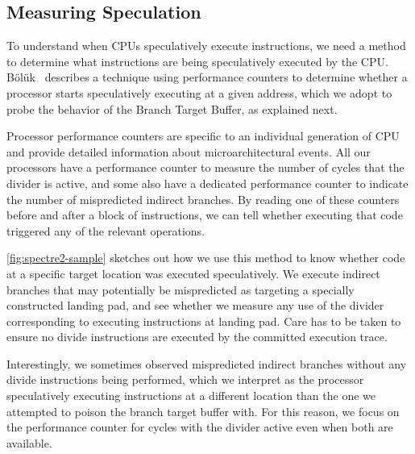 \subsection{Measuring Speculation}

To understand when CPUs speculatively execute instructions, we need a
method to determine what instructions are being speculatively executed
by the CPU.  Bölük~\cite{speculating-x86} describes a technique using
performance counters to determine whether a processor starts
speculatively executing at a given address, which we adopt to probe
the behavior of the Branch Target Buffer, as explained next.

Processor performance counters are specific to an individual generation of CPU and provide detailed information about microarchitectural events.
All our processors have a performance counter to measure the number of cycles that the divider is active, and some also have a dedicated performance counter to indicate the number of mispredicted indirect branches.
By reading one of these counters before and after a block of instructions, we can tell whether executing that code triggered any of the relevant operations.

\autoref{fig:spectre2-sample} sketches out how we use this method to know whether code at a specific target location was executed speculatively.
We execute indirect branches that may potentially be mispredicted as targeting a specially constructed landing pad, and see whether we measure any use of the divider corresponding to executing instructions at landing pad.
Care has to be taken to ensure no divide instructions are executed by the committed execution trace.

Interestingly, we sometimes observed mispredicted indirect branches without any divide instructions being performed, which we interpret as the processor speculatively executing instructions at a different location than the one we attempted to poison the branch target buffer with.
For this reason, we focus on the performance counter for cycles with the divider active even when both are available.



